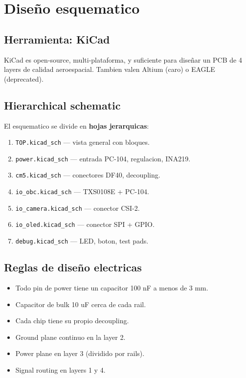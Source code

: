 \documentclass[11pt,a4paper,oneside,openright]{book}
\begin{document}
\chapter{Diseño esquematico}

\section{Herramienta: KiCad}

KiCad es open-source, multi-plataforma, y suficiente para diseñar un PCB
de 4 layers de calidad aeroespacial. Tambien valen Altium (caro) o EAGLE
(deprecated).

\section{Hierarchical schematic}

El esquematico se divide en \textbf{hojas jerarquicas}:

\begin{enumerate}[leftmargin=2em]
  \item \texttt{TOP.kicad\_sch} --- vista general con bloques.
  \item \texttt{power.kicad\_sch} --- entrada PC-104, regulacion, INA219.
  \item \texttt{cm5.kicad\_sch} --- conectores DF40, decoupling.
  \item \texttt{io\_obc.kicad\_sch} --- TXS0108E + PC-104.
  \item \texttt{io\_camera.kicad\_sch} --- conector CSI-2.
  \item \texttt{io\_oled.kicad\_sch} --- conector SPI + GPIO.
  \item \texttt{debug.kicad\_sch} --- LED, boton, test pads.
\end{enumerate}

\section{Reglas de diseño electricas}

\begin{itemize}[leftmargin=2em]
  \item Todo pin de power tiene un capacitor 100 nF a menos de 3 mm.
  \item Capacitor de bulk 10 uF cerca de cada rail.
  \item Cada chip tiene su propio decoupling.
  \item Ground plane continuo en la layer 2.
  \item Power plane en layer 3 (dividido por rails).
  \item Signal routing en layers 1 y 4.
\end{itemize}
\end{document}
